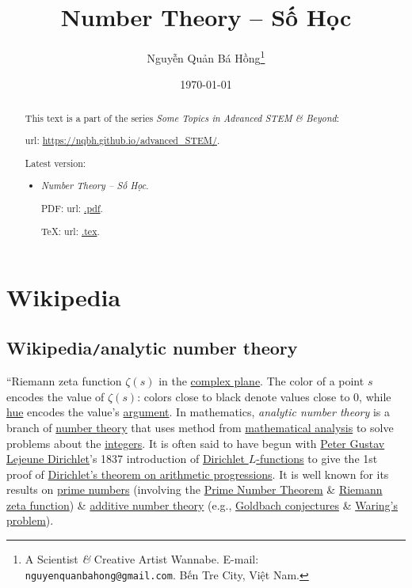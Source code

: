 \documentclass{article}
\title{Number Theory -- Số Học}
\author{Nguyễn Quản Bá Hồng\footnote{A Scientist {\it\&} Creative Artist Wannabe. E-mail: {\tt nguyenquanbahong@gmail.com}. Bến Tre City, Việt Nam.}}
\date{\today}
\begin{document}
\maketitle
\begin{abstract}
	This text is a part of the series {\it Some Topics in Advanced STEM \& Beyond}:
	
	{\sc url}: \url{https://nqbh.github.io/advanced_STEM/}.
	
	Latest version:
	\begin{itemize}
		\item {\it Number Theory -- Số Học}.
		
		PDF: {\sc url}: \url{.pdf}.
		
		\TeX: {\sc url}: \url{.tex}.
	\end{itemize}
\end{abstract}
\tableofcontents


\section{Wikipedia}

\subsection{Wikipedia{\tt/}analytic number theory}
``{\sf Riemann zeta function $\zeta(s)$ in the \href{https://en.wikipedia.org/wiki/Complex_plane}{complex plane}. The color of a point $s$ encodes the value of $\zeta(s)$: colors close to black denote values close to 0, while \href{https://en.wikipedia.org/wiki/Hue}{hue} encodes the value's \href{https://en.wikipedia.org/wiki/Argument_(complex_analysis)}{argument}.} In mathematics, {\it analytic number theory} is a branch of \href{https://en.wikipedia.org/wiki/Number_theory}{number theory} that uses method from \href{https://en.wikipedia.org/wiki/Mathematical_analysis}{mathematical analysis} to solve problems about the \href{https://en.wikipedia.org/wiki/Integer}{integers}. It is often said to have begun with \href{https://en.wikipedia.org/wiki/Peter_Gustav_Lejeune_Dirichlet}{\sc Peter Gustav Lejeune Dirichlet}'s 1837 introduction of \href{https://en.wikipedia.org/wiki/Dirichlet_L-function}{Dirichlet $L$-functions} to give the 1st proof of \href{https://en.wikipedia.org/wiki/Dirichlet%27s_theorem_on_arithmetic_progressions}{Dirichlet's theorem on arithmetic progressions}. It is well known for its results on \href{https://en.wikipedia.org/wiki/Prime_numbers}{prime numbers} (involving the \href{https://en.wikipedia.org/wiki/Prime_Number_Theorem}{Prime Number Theorem} \& \href{https://en.wikipedia.org/wiki/Riemann_zeta_function}{Riemann zeta function}) \& \href{https://en.wikipedia.org/wiki/Additive_number_theory}{additive number theory} (e.g., \href{https://en.wikipedia.org/wiki/Goldbach_conjecture}{Goldbach conjectures} \& \href{https://en.wikipedia.org/wiki/Waring%27s_problem}{Waring's problem}).
\end{document}
